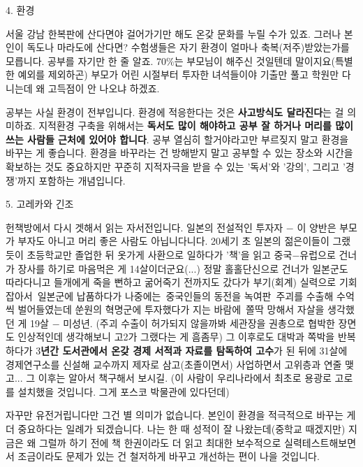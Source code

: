 \item 4. 환경
\vspace{5mm}

서울 강남 한복판에 산다면야 걸어가기만 해도 온갖 문화를 누릴 수가 있죠.
그러나 본인이 독도나 마라도에 산다면?
수험생들은 자기 환경이 얼마나 축복(저주)받았는가를 모릅니다.
공부를 자기만 한 줄 알죠. 70$\%$는 부모님이 해주신 것일텐데 말이지요(특별한 예외를 제외하곤)
부모가 어린 시절부터 투자한 녀석들이야 기출만 풀고 학원만 다니는데 왜 고득점이 안 나오냐 하겠죠.
\vspace{5mm}

공부는 사실 환경이 전부입니다. 환경에 적응한다는 것은 \textbf{사고방식도 달라진다}는 걸 의미하죠.
지적환경 구축을 위해서는 \textbf{독서도 많이 해야하고 공부 잘 하거나 머리를 많이 쓰는 사람들 근처에 있어야 합니다}.
공부 열심히 할거야라고만 부르짖지 말고 환경을 바꾸는 게 좋습니다.
환경을 바꾸라는 건 방해받지 말고 공부할 수 있는 장소와 시간을 확보하는 것도 중요하지만
꾸준히 지적자극을 받을 수 있는 '독서'와 '강의', 그리고 '경쟁'까지 포함하는 개념입니다.
\vspace{5mm}

\item 5. 고레카와 긴조
\vspace{5mm}

헌책방에서 다시 겟해서 읽는 자서전입니다. 일본의 전설적인 투자자 $-$
이 양반은 부모가 부자도 아니고 머리 좋은 사람도 아닙니다니다.
20세기 초 일본의 젊은이들이 그랬듯이 초등학교만 졸업한 뒤 옷가게 사환으로 일하다가
'책'을 읽고 중국$-$유럽으로 건너가 장사를 하기로 마음먹은 게 14살이더군요(...)
정말 홀홀단신으로 건너가 일본군도 따라다니고 들개에게 죽을 뻔하고 굶어죽기 전까지도 갔다가
부기(회계) 실력으로 기회 잡아서 일본군에 납품하다가 나중에는 중국인들의 동전을 녹여판 주괴를 수출해
수억씩 벌어들였는데 쑨원의 혁명군에 투자했다가 지는 바람에 쫄딱 망해서 자살을 생각했던 게 19살 $-$ 미성년.
(주괴 수출이 허가되지 않을까봐 세관장을 권총으로 협박한 장면도 인상적인데 생각해보니 고2가 그랬다는 게 흠좀무)
그 이후로도 대박과 쪽박을 반복하다가 3\textbf{년간 도서관에서 온갖 경제 서적과 자료를 탐독하여 고수}가 된 뒤에
31살에 경제연구소를 신설해 교수까지 제자로 삼고(초졸이면서) 사업하면서 고위층과 연줄 맺고... 그 이후는 알아서 책구해서 보시길.
(이 사람이 우리나라에서 최초로 용광로 고로를 설치했을 것입니다. 그게 포스코 박물관에 있다던데)
\vspace{5mm}

자꾸만 유전거립니다만 그건 별 의미가 없습니다. 본인이 환경을 적극적으로 바꾸는 게 더 중요하다는 일례가 되겠습니다.
나는 한 때 성적이 잘 나왔는데(중학교 때겠지만) 지금은 왜 그럴까 하기 전에 책 한권이라도 더 읽고
최대한 보수적으로 실력테스트해보면서 조금이라도 문제가 있는 건 철저하게 바꾸고 개선하는 편이 나을 것입니다.
\vspace{5mm}

